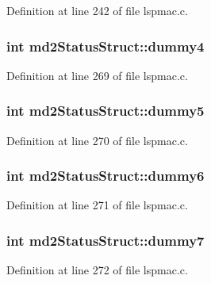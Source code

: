 Definition at line 242 of file lspmac.\-c.

\hypertarget{structmd2StatusStruct_adaa01db9cf77d95756bc3156fb702600}{
\subsubsection[{dummy4}]{\setlength{\rightskip}{0pt plus 5cm}int md2\-Status\-Struct\-::dummy4}}\label{structmd2StatusStruct_adaa01db9cf77d95756bc3156fb702600}


Definition at line 269 of file lspmac.\-c.

\hypertarget{structmd2StatusStruct_af4f8869f8954c6162cae80000c54694f}{
\subsubsection[{dummy5}]{\setlength{\rightskip}{0pt plus 5cm}int md2\-Status\-Struct\-::dummy5}}\label{structmd2StatusStruct_af4f8869f8954c6162cae80000c54694f}


Definition at line 270 of file lspmac.\-c.

\hypertarget{structmd2StatusStruct_a864a2234ede061ec2380230ebf29ce70}{
\subsubsection[{dummy6}]{\setlength{\rightskip}{0pt plus 5cm}int md2\-Status\-Struct\-::dummy6}}\label{structmd2StatusStruct_a864a2234ede061ec2380230ebf29ce70}


Definition at line 271 of file lspmac.\-c.

\hypertarget{structmd2StatusStruct_a91f38d814222edeffa67a6a3ab61f5d6}{
\subsubsection[{dummy7}]{\setlength{\rightskip}{0pt plus 5cm}int md2\-Status\-Struct\-::dummy7}}\label{structmd2StatusStruct_a91f38d814222edeffa67a6a3ab61f5d6}


Definition at line 272 of file lspmac.\-c.

